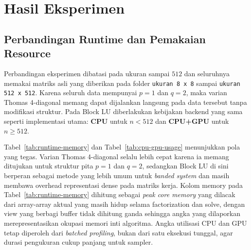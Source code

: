 \documentclass[12pt,a4paper]{article}
\begin{document}
\section{Hasil Eksperimen}
\subsection{Perbandingan Runtime dan Pemakaian Resource}
Perbandingan eksperimen dibatasi pada ukuran sampai $512$ dan seluruhnya memakai matriks asli yang diberikan pada folder \texttt{ukuran 8 x 8} sampai \texttt{ukuran 512 x 512}. Karena seluruh data mempunyai $p=1$ dan $q=2$, maka varian Thomas 4-diagonal memang dapat dijalankan langsung pada data tersebut tanpa modifikasi struktur. Pada Block LU diberlakukan kebijakan backend yang sama seperti implementasi utama: \textbf{CPU} untuk $n<512$ dan \textbf{CPU+GPU} untuk $n\geq512$.

\begin{table}[h]
\centering
\caption{Perbandingan runtime dan peak memory inti algoritma antara Block LU dan varian Thomas 4-diagonal.}
\label{tab:runtime-memory}
\end{table}

Tabel~\ref{tab:runtime-memory} dan Tabel~\ref{tab:cpu-gpu-usage} menunjukkan pola yang tegas. Varian Thomas 4-diagonal selalu lebih cepat karena ia memang ditujukan untuk struktur pita $p=1$ dan $q=2$, sedangkan Block LU di sini berperan sebagai metode yang lebih umum untuk \emph{banded system} dan masih membawa overhead representasi dense pada matriks kerja. Kolom memory pada Tabel~\ref{tab:runtime-memory} dihitung sebagai \emph{peak core memory} yang dilacak dari array-array aktual yang masih hidup selama factorization dan solve, dengan view yang berbagi buffer tidak dihitung ganda sehingga angka yang dilaporkan merepresentasikan okupasi memori inti algoritma. Angka utilisasi CPU dan GPU tetap diperoleh dari \emph{batched profiling}, bukan dari satu eksekusi tunggal, agar durasi pengukuran cukup panjang untuk sampler.
\end{document}
